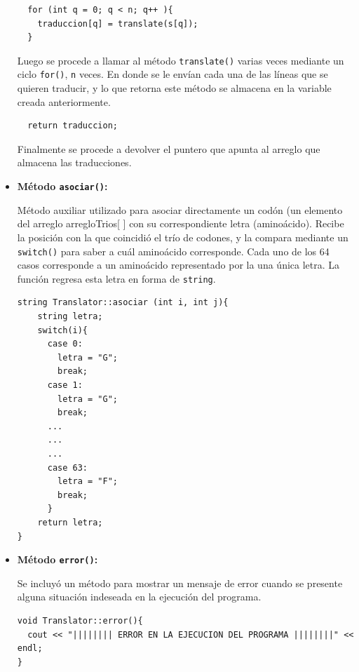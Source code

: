 \begin{itemize}
\begin{verbatim}
  for (int q = 0; q < n; q++ ){
    traduccion[q] = translate(s[q]);
  }
\end{verbatim}
Luego se procede a llamar al método \texttt{translate()} varias veces mediante un ciclo \texttt{for()}, \texttt{n} veces. En donde se le envían cada una de las líneas que se quieren traducir, y lo que retorna este método se almacena en la variable creada anteriormente.

\begin{verbatim}
  return traduccion;
\end{verbatim}

Finalmente se procede a devolver el puntero que apunta al arreglo que almacena las traducciones.

\item \textbf{Método \texttt{asociar()}:}

Método auxiliar utilizado para asociar directamente un codón (un elemento del arreglo arregloTrios[ ] con su correspondiente letra (aminoácido). Recibe la posición con la que coincidió el trío de codones, y la compara mediante un \texttt{switch()} para saber a cuál aminoácido corresponde. Cada uno de los 64 casos corresponde a un aminoácido representado por la una única letra. La función regresa esta letra en forma de \texttt{string}.

\begin{verbatim}
string Translator::asociar (int i, int j){
    string letra;
    switch(i){
      case 0:
        letra = "G";
  		break;
      case 1:
        letra = "G";
  		break;
      ...
      ...
      ...
      case 63:
        letra = "F";
  		break;
      }
    return letra;
}
\end{verbatim}


\item \textbf{Método \texttt{error()}:}

Se incluyó un método para mostrar un mensaje de error cuando se presente alguna situación indeseada en la ejecución del programa.

\begin{verbatim}
void Translator::error(){
  cout << "|||||||| ERROR EN LA EJECUCION DEL PROGRAMA ||||||||" << endl;
}
\end{verbatim}
\end{itemize}


